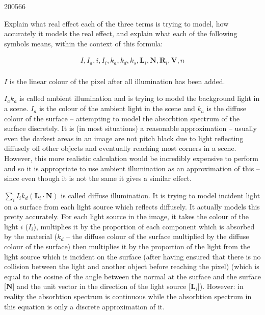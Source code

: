 \documentclass[10pt,\jkfside,a4paper]{article}
\begin{document}
\begin{enumerate}[label=(\alph*)]
\begin{examquestion}{2005}{6}{6}
\begin{enumerate}[label=(\alph*)]
Explain what real effect each of the three terms is trying to model, how
accurately it models the real effect, and explain what each of the following
symbols means, within the context of this formula:

\begin{equation*}
\begin{split}
I, I_a, i, I_i, k_a, k_d, k_s, \mathbf{L}_i, \mathbf{N}, \mathbf{R}_i, \mathbf{V}, n\\
\end{split}
\end{equation*}

$I$ is the linear colour of the pixel after all illumination has been added.

$I_ak_a$ is called ambient illumination and is trying to model the background light in a scene. 
$I_a$ is the colour of the ambient light in the scene and $k_a$ is the diffuse colour of the surface -- 
attempting to model the absorbtion spectrum of the surface discretely.
It is (in most situations) a reasonable approximation -- usually even the darkest areas in an 
image are not pitch black due to light reflecting diffusely off other objects and eventually 
reaching most corners in a scene. However, this more realistic calculation would be incredibly 
expensive to perform and so it is appropriate to use ambient illumination as an approximation 
of this -- since even though it is not the same it gives a similar effect.

$\sum_{i}I_ik_d(\mathbf{L}_i\cdot \mathbf{N})$ is called diffuse illumination. It is trying to 
model incident light on a surface from each light source which reflects diffusely. It actually 
models this pretty accurately. For each light source in the image, it takes the colour of the 
light $i$ ($I_i$), multiplies it by the proportion of each component which is absorbed by the 
material ($k_d$ -- the diffuse colour of the surface multiplied by the diffuse colour of the 
surface) then multiplies it by the proportion of the light from the light source which is incident 
on the surface (after having ensured that there is no collision between the light and another object 
before reaching the pixel) (which is equal to the cosine of the angle between the normal at the surface and the 
surface [$\mathbf{N}$] and the unit vector in the direction of the light source [$\mathbf{L}_i$]). 
However: in reality the absorbtion spectrum is continuous while the absorbtion spectrum in this 
equation is only a discrete approximation of it.


\end{enumerate}
\end{examquestion}
\end{enumerate}
\end{document}
